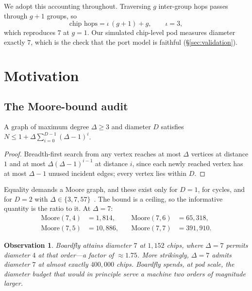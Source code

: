 \documentclass[sigconf,nonacm]{acmart}
\theoremstyle{acmdefinition}%
\newtheorem{observation}[theorem]{Observation}%
\begin{document}
We adopt this accounting throughout. Traversing $g$ inter-group hops passes
through $g+1$ groups, so
\begin{equation}
\label{eq:chiphops}
\text{chip hops} = \iota\,(g+1)+g, \qquad \iota=3,
\end{equation}
which reproduces $7$ at $g=1$. Our simulated chip-level pod measures diameter
exactly $7$, which is the check that the port model is faithful
(\S\ref{sec:validation}).

\section{Motivation}
\label{sec:moore}

\subsection{The Moore-bound audit}

\begin{theorem}
A graph of maximum degree $\Delta\ge3$ and diameter $D$ satisfies
$N \le 1+\Delta\sum_{i=0}^{D-1}(\Delta-1)^i$.
\end{theorem}

\begin{proof}
Breadth-first search from any vertex reaches at most $\Delta$ vertices at
distance $1$ and at most $\Delta(\Delta-1)^{i-1}$ at distance $i$, since each
newly reached vertex has at most $\Delta-1$ unused incident edges; every vertex
lies within $D$.
\end{proof}

Equality demands a Moore graph, and these exist only for $D=1$, for cycles, and
for $D=2$ with $\Delta\in\{3,7,57\}$~\cite{hoffman1960}. The bound is a ceiling,
so the informative quantity is the ratio to it. At $\Delta=7$:
\[
\begin{aligned}
\text{Moore}(7,4) &= 1{,}814, &\quad \text{Moore}(7,6) &= 65{,}318,\\
\text{Moore}(7,5) &= 10{,}886, &\quad \text{Moore}(7,7) &= 391{,}910.
\end{aligned}
\]

\begin{observation}
Boardfly attains diameter $7$ at $1{,}152$ chips, where $\Delta=7$ permits
diameter $4$ at that order---a factor of ${\approx}1.75$. More strikingly,
$\Delta=7$ admits diameter $7$ at almost exactly $400{,}000$ chips. Boardfly
spends, at pod scale, the diameter budget that would in principle serve a
machine two orders of magnitude larger.
\end{observation}
\end{document}
